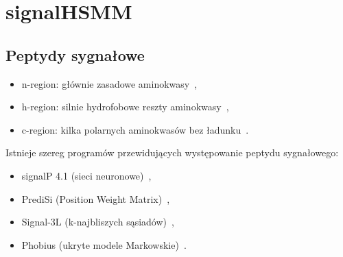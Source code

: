 \documentclass[10pt]{beamer}\usepackage[]{graphicx}\usepackage[]{color}
\begin{document}
\section{signalHSMM}

\subsection{Peptydy sygnałowe}

\begin{frame}

\begin{figure}[ht]
        \centering
\end{figure}

      \begin{itemize}
        \item n-region: głównie zasadowe aminokwasy~\citep{nielsen_prediction_1998},
        \item h-region: silnie hydrofobowe reszty aminokwasy~\citep{nielsen_prediction_1998},
        \item c-region: kilka polarnych aminokwasów bez ładunku~\citep{jain_signal_1994}.
      \end{itemize}


\end{frame}

\begin{frame}

Istnieje szereg programów przewidujących występowanie peptydu sygnałowego:
\begin{itemize}
\item signalP 4.1 (sieci neuronowe)~\citep{petersen_signalp_2011},
\item PrediSi (Position Weight Matrix)~\citep{hiller_predisi:_2004},
\item Signal-3L (k-najbliszych sąsiadów)~\citep{shen_signal-3l:_2007},
\item Phobius (ukryte modele Markowskie)~\citep{kall_combined_2004}.
\end{itemize}

\end{frame}
\end{document}

